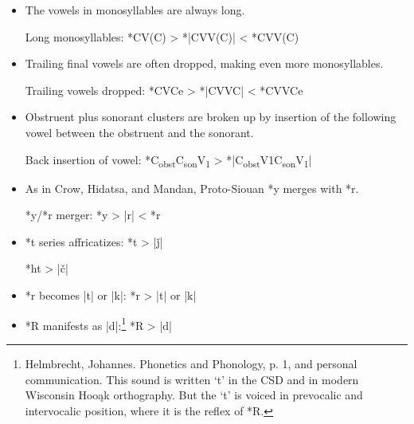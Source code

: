 \documentclass[output=paper]{LSP/langsci}
\begin{document}
\begin{itemize}
\item The vowels in monosyllables are always long.
\begin{center}
Long monosyllables: \hspace{1em} *CV(C)    >	*|CVV(C)|     <	*CVV(C)
\end{center}
\item Trailing final vowels are often dropped, making even more monosyllables.
\begin{center}
Trailing vowels dropped: \hspace{1em} 	*CVCe    >	*|CVVC|        <	*CVVCe
\end{center}
\item Obstruent plus sonorant clusters are broken up by insertion of the following vowel between the obstruent and the sonorant.
\begin{center}
Back insertion of vowel:	 \hspace{1em}  *C\textsubscript{obst}C\textsubscript{son}V\textsubscript{1}    >	*|C\textsubscript{obst}V1C\textsubscript{son}V\textsubscript{1}|
\end{center}
\item As in Crow, Hidatsa, and Mandan, Proto-Siouan *y merges with *r.
\begin{center}
*y/*r merger: \hspace{1em} *y	>	|r|	<	*r
\end{center}
\item *t series affricatizes: \hspace{1em} *t  >  |\v{j}|  

\hspace{9.2em} *ht	 >  |\v{c}|  

\item *r\textsuperscript{} becomes |t\textsuperscript{}| or |k\textsuperscript{}|: \hspace{1em} *r\textsuperscript{}	>	|t\textsuperscript{}| or |k\textsuperscript{}|
\item *R manifests as |d|:\footnote{Helmbrecht, Johannes. Phonetics and Phonology, p. 1, and personal communication. This sound is written `t' in the CSD and in modern Wisconsin Hoo\k{a}k orthography. But the `t' is voiced in prevocalic and intervocalic position, where it is the reflex of *R.} \hspace{2em} *R	>	|d|
\end{itemize}

\end{document}
